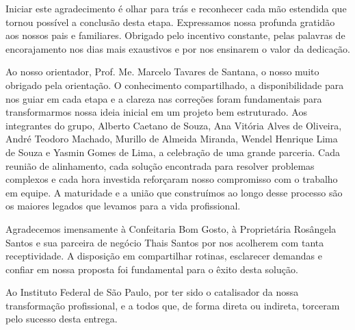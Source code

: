 \begin{agradecimentos}
Iniciar este agradecimento é olhar para trás e reconhecer cada mão estendida que tornou possível a conclusão desta etapa. Expressamos nossa profunda gratidão aos nossos pais e familiares. Obrigado pelo incentivo constante, pelas palavras de encorajamento nos dias mais exaustivos e por nos ensinarem o valor da dedicação. 

Ao nosso orientador, Prof. Me. Marcelo Tavares de Santana, o nosso muito obrigado pela orientação. O conhecimento compartilhado, a disponibilidade para nos guiar em cada etapa e a clareza nas correções foram fundamentais para transformarmos nossa ideia inicial em um projeto bem estruturado.
Aos integrantes do grupo, Alberto Caetano de Souza, Ana Vitória Alves de Oliveira, André Teodoro Machado, Murillo de Almeida Miranda, Wendel Henrique Lima de Souza e Yasmin Gomes de Lima, a celebração de uma grande parceria. Cada reunião de alinhamento, cada solução encontrada para resolver problemas complexos e cada hora investida reforçaram nosso compromisso com o trabalho em equipe. A maturidade e a união que construímos ao longo desse processo são os maiores legados que levamos para a vida profissional.

Agradecemos imensamente à Confeitaria Bom Gosto, à Proprietária Rosângela Santos e sua parceira de negócio Thais Santos por nos acolherem com tanta receptividade. A disposição em compartilhar rotinas, esclarecer demandas e confiar em nossa proposta foi fundamental para o êxito desta solução.

Ao Instituto Federal de São Paulo, por ter sido o catalisador da nossa transformação profissional, e a todos que, de forma direta ou indireta, torceram pelo sucesso desta entrega.

\end{agradecimentos}